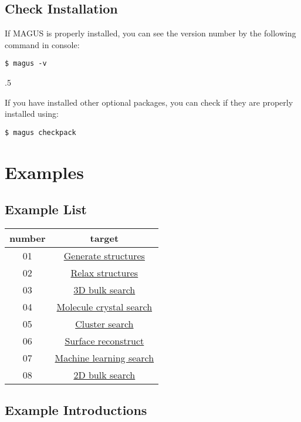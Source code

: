 \documentclass[12pt,oneside]{book}
\begin{document}
\section{Check Installation}
If MAGUS is properly installed, you can see the version number by the following command in console:
\begin{tcolorbox}
    \begin{verbatim}
$ magus -v
    \end{verbatim}
.5
\end{tcolorbox}

If you have installed other optional packages, you can check if they are properly installed using:
\begin{tcolorbox}
    \begin{verbatim}
$ magus checkpack
    \end{verbatim}
\end{tcolorbox}

\chapter{Examples}
\section{Example List}
\begin{table}[h]
\centering
\begin{tabular}{c|c}
\hline
number &  target  \\ \hline
01     &  \hyperref[Generate structures]{Generate structures}\\
02     &  \hyperref[Relax structures]{Relax structures}\\
03     &  \hyperref[3D bulk search]{3D bulk search}\\
04     &  \hyperref[Molecule crystal search]{Molecule crystal search}\\
05     &  \hyperref[Cluster search]{Cluster search}\\
06     &  \hyperref[Surface reconstruct]{Surface reconstruct}\\
07     &  \hyperref[Machine learning search]{Machine learning search}\\
08     &  \hyperref[2D bulk search]{2D bulk search}\\ \hline
\end{tabular}
\end{table}

\section{Example Introductions}
\end{document}
